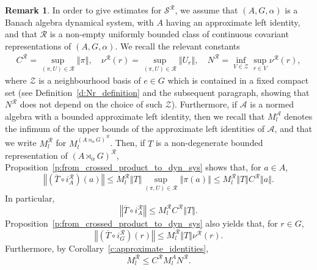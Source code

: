 \documentclass{amsart}
\theoremstyle{plain}
\theoremstyle{definition}
\newtheorem{remark}[theorem]{Remark}
\numberwithin{equation}{section}
\begin{document}
\begin{remark}
In order to give estimates for ${{\mathcal S}^{\mathcal R}}$, we assume that ${(A,G,\alpha)}$ is a Banach algebra dynamical system, with $A$ having an approximate left identity, and that  ${\mathcal R}$ is a non-empty uniformly bounded class of continuous covariant representations of ${(A,G,\alpha)}$. We recall the relevant constants
\begin{align*}
  {{C^{\mathcal R}}} = \sup_{{(\pi,U)} \in {\mathcal R}} {\left\Vert {\pi} \right\Vert}, \quad {\nu^{\mathcal R}}(r) = \sup_{{(\pi,U)} \in {\mathcal R}} {\left\Vert {U_r} \right\Vert}, \quad {N^{\mathcal R}} = \inf_{V \in \mathcal{Z}} \sup_{r \in V} {\nu^{\mathcal R}}(r),
\end{align*}
where $\mathcal{Z}$ is a neighbourhood basis of $e \in G$ which is contained in a fixed compact set (see Definition~\ref{d:Nr_definition} and the subsequent paragraph, showing that ${N^{\mathcal R}}$ does not depend on the choice of such $\mathcal Z$). Furthermore, if $\mathcal A$ is a normed algebra with a bounded approximate left identity, then we recall that $M_l^{\mathcal A}$ denotes the infimum of the upper bounds of the approximate left identities of ${\mathcal A}$, and that we write $M_l^{\mathcal R}$ for $M_l^{(A {\rtimes}_\alpha G)^\mathcal{R}}$. Then, if $T$ is a non-degenerate bounded representation of ${(A {\rtimes}_\alpha G)^\mathcal{R}}$, Proposition~\ref{p:from_crossed_product_to_dyn_sys} shows that, for $a\in A$,
\begin{equation*}
{\left\Vert {\left(\overline{T} \circ i_A^{\mathcal R}\right)(a)} \right\Vert} \leq M_l^{\mathcal R} {\left\Vert {T} \right\Vert} \sup_{{(\pi,U)}\in {\mathcal R}} {\left\Vert {\pi(a)} \right\Vert} \leq M_l^{\mathcal R} {\left\Vert {T} \right\Vert} {{C^{\mathcal R}}} {\left\Vert {a} \right\Vert}.
\end{equation*}
In particular,
\begin{equation}\label{e:pi_bound_from_crossed_product_to_dyn_sys_in_general_correspondence_section}
{\left\Vert {\overline{T} \circ i_A^{\mathcal R}} \right\Vert}\leq M_l^{\mathcal R} {{C^{\mathcal R}}} {\left\Vert {T} \right\Vert}.
\end{equation}
Proposition~\ref{p:from_crossed_product_to_dyn_sys} also yields that, for $r\in G$,
\begin{equation}\label{e:pointwise_U_bound_from_crossed_product_to_dyn_sys_in_general_correspondence_section}
{\left\Vert {\left(\overline{T} \circ i_G^{\mathcal R}\right)(r)} \right\Vert} \leq M_l^{\mathcal R} {\left\Vert {T} \right\Vert}  {\nu^{\mathcal R}}(r).
\end{equation}
Furthermore, by Corollary~\ref{c:approximate_identities},
\begin{equation}\label{e:upper_bound_estimate_for_bounded_approximate_left_identity}
M_l^{\mathcal R} \leq {{C^{\mathcal R}}} M_l^A {N^{\mathcal R}}.
\end{equation}
\end{remark}
\end{document}
